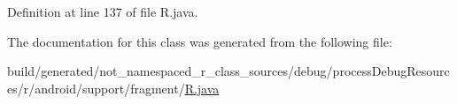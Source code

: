Definition at line 137 of file R.\+java.



The documentation for this class was generated from the following file\+:\begin{DoxyCompactItemize}
\item 
build/generated/not\+\_\+namespaced\+\_\+r\+\_\+class\+\_\+sources/debug/process\+Debug\+Resources/r/android/support/fragment/\mbox{\hyperlink{android_2support_2fragment_2_r_8java}{R.\+java}}\end{DoxyCompactItemize}
